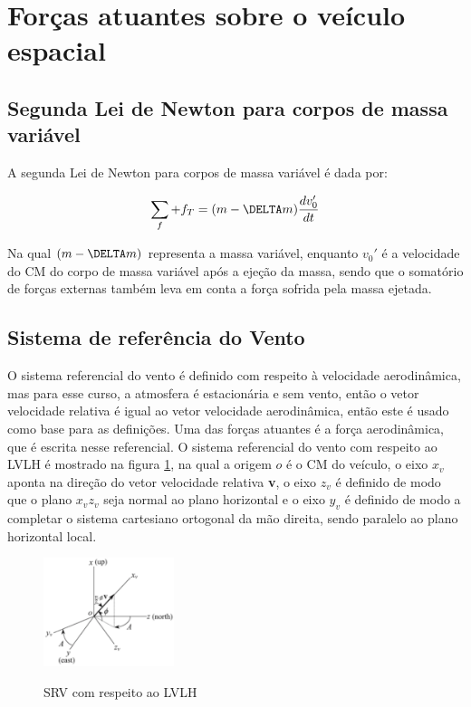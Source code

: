 \section{Forças atuantes sobre o veículo espacial}

\subsection{Segunda Lei de Newton para corpos de massa variável}
A segunda Lei de Newton para corpos de massa variável é dada por:

\begin{equation}
    \sum_{f} + f_{T} = (m - \DELTA m)\frac{dv_{0}'}{dt}
\end{equation}

Na qual $(m - \DELTA m)$ representa a massa variável, enquanto $v_{0}'$ é a velocidade do CM do corpo de massa variável após a ejeção da massa, sendo que o somatório de forças externas também leva em conta a força sofrida pela massa ejetada. 

\subsection{Sistema de referência do Vento}

O sistema referencial do vento é definido com respeito à velocidade aerodinâmica, mas para esse curso, a atmosfera é estacionária e sem vento, então o vetor velocidade relativa é igual ao vetor velocidade aerodinâmica, então este é usado como base para as definições. Uma das forças atuantes é a força aerodinâmica, que é escrita nesse referencial. O sistema referencial do vento com respeito ao LVLH é mostrado na figura \ref{fig:refvento}, na qual a origem $o$ é o CM do veículo, o eixo $x_{v}$ aponta na direção do vetor velocidade relativa \textbf{v}, o eixo $z_{v}$ é definido de modo que o plano $x_{v}z_{v}$ seja normal ao plano horizontal e o eixo $y_{v}$ é definido de modo a completar o sistema cartesiano ortogonal da mão direita, sendo paralelo ao plano horizontal local. 

\begin{figure}[h]
    \begin{center}
        \caption{SRV com respeito ao LVLH}
        \includegraphics[width=1.5in]{figuras/vento.png}
        \label{fig:refvento}
     \end{center}
\end{figure}

